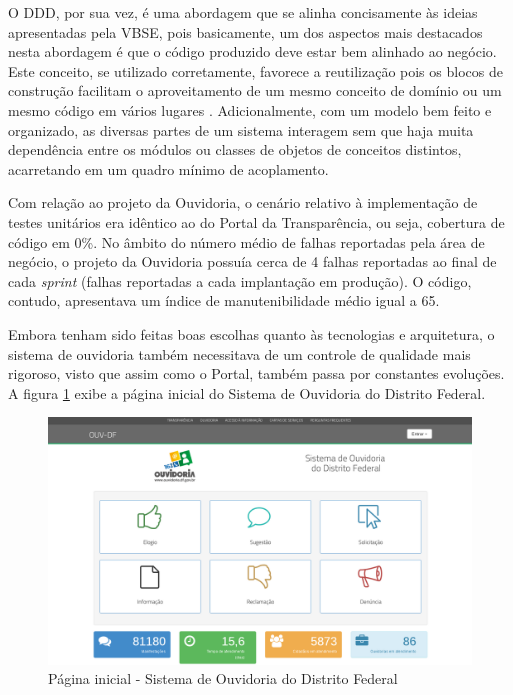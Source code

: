O DDD, por sua vez, é uma abordagem que se alinha concisamente às ideias apresentadas pela VBSE, pois basicamente, um dos aspectos mais destacados nesta abordagem é que o código produzido deve estar bem alinhado ao negócio. Este conceito, se utilizado corretamente, favorece a reutilização pois os blocos de construção facilitam o aproveitamento de um mesmo conceito de domínio ou um mesmo código em vários lugares \cite{ddd}. Adicionalmente, com um modelo bem feito e organizado, as diversas partes de um sistema interagem sem que haja muita dependência entre os módulos ou classes de objetos de conceitos distintos, acarretando em um quadro mínimo de acoplamento.

Com relação ao projeto da Ouvidoria, o cenário relativo à implementação de testes unitários era idêntico ao do Portal da Transparência, ou seja, cobertura de código em 0\%. No âmbito do número médio de falhas reportadas pela área de negócio, o projeto da Ouvidoria possuía cerca de 4 falhas reportadas ao final de cada \textit{sprint} (falhas reportadas a cada implantação em produção). O código, contudo, apresentava um índice de manutenibilidade médio igual a 65.

Embora tenham sido feitas boas escolhas quanto às tecnologias e arquitetura, o sistema de ouvidoria também necessitava de um controle de qualidade mais rigoroso, visto que assim como o Portal, também passa por constantes evoluções. A figura \ref{fig:inicioOuvdf} exibe a página inicial do Sistema de Ouvidoria do Distrito Federal.

\begin{figure}[h]
\includegraphics[width=\textwidth]{figuras/sistemaOuvidoria.png}
\caption{Página inicial - Sistema de Ouvidoria do Distrito Federal}
\label{fig:inicioOuvdf}
\end{figure}

